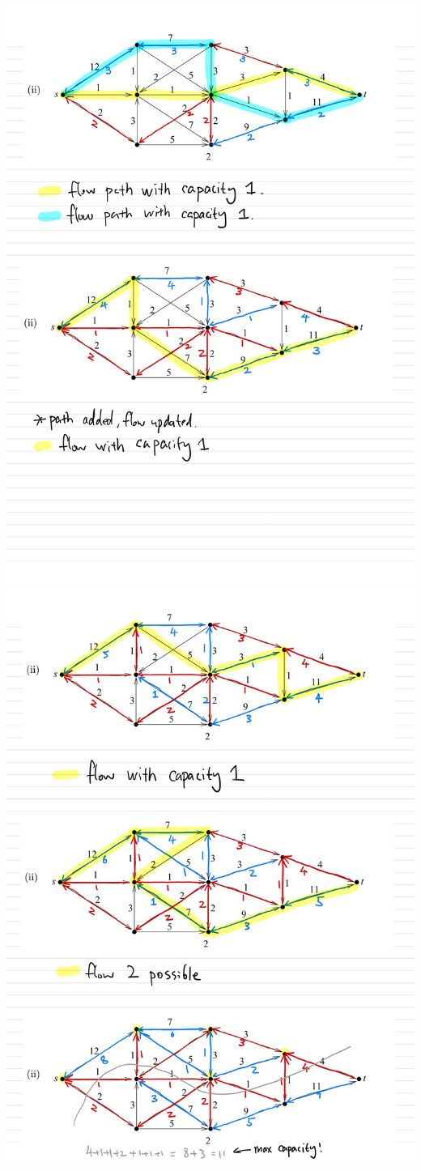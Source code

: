 \documentclass[]{article}
\theoremstyle{definition}
\begin{document}
    \includegraphics[width=16cm]{HW6-8.jpg}
    \\
    \includegraphics[width=16cm]{HW6-9.jpg}
\end{document}

